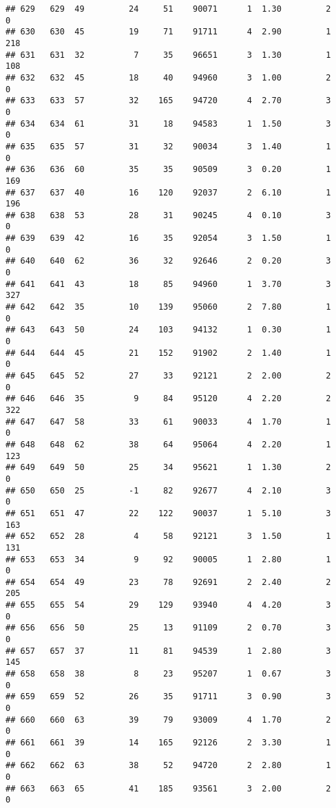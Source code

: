 \documentclass[
]{article}
\begin{document}
\begin{verbatim}
## 629   629  49         24     51    90071      1  1.30         2        0
## 630   630  45         19     71    91711      4  2.90         1      218
## 631   631  32          7     35    96651      3  1.30         1      108
## 632   632  45         18     40    94960      3  1.00         2        0
## 633   633  57         32    165    94720      4  2.70         3        0
## 634   634  61         31     18    94583      1  1.50         3        0
## 635   635  57         31     32    90034      3  1.40         1        0
## 636   636  60         35     35    90509      3  0.20         1      169
## 637   637  40         16    120    92037      2  6.10         1      196
## 638   638  53         28     31    90245      4  0.10         3        0
## 639   639  42         16     35    92054      3  1.50         1        0
## 640   640  62         36     32    92646      2  0.20         3        0
## 641   641  43         18     85    94960      1  3.70         3      327
## 642   642  35         10    139    95060      2  7.80         1        0
## 643   643  50         24    103    94132      1  0.30         1        0
## 644   644  45         21    152    91902      2  1.40         1        0
## 645   645  52         27     33    92121      2  2.00         2        0
## 646   646  35          9     84    95120      4  2.20         2      322
## 647   647  58         33     61    90033      4  1.70         1        0
## 648   648  62         38     64    95064      4  2.20         1      123
## 649   649  50         25     34    95621      1  1.30         2        0
## 650   650  25         -1     82    92677      4  2.10         3        0
## 651   651  47         22    122    90037      1  5.10         3      163
## 652   652  28          4     58    92121      3  1.50         1      131
## 653   653  34          9     92    90005      1  2.80         1        0
## 654   654  49         23     78    92691      2  2.40         2      205
## 655   655  54         29    129    93940      4  4.20         3        0
## 656   656  50         25     13    91109      2  0.70         3        0
## 657   657  37         11     81    94539      1  2.80         3      145
## 658   658  38          8     23    95207      1  0.67         3        0
## 659   659  52         26     35    91711      3  0.90         3        0
## 660   660  63         39     79    93009      4  1.70         2        0
## 661   661  39         14    165    92126      2  3.30         1        0
## 662   662  63         38     52    94720      2  2.80         1        0
## 663   663  65         41    185    93561      3  2.00         2        0

\end{verbatim}
\end{document}
